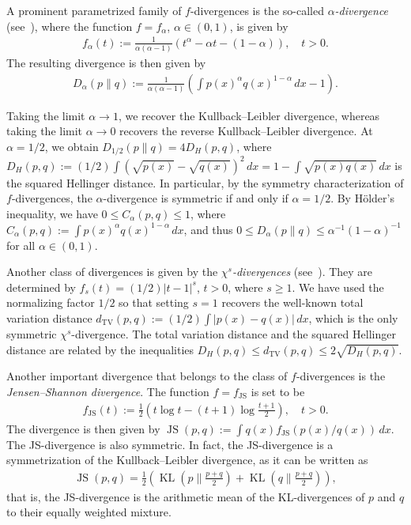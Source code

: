 A prominent parametrized family of $f$-divergences is the so-called \textit{$\alpha$-divergence} (see~\cite[Equation~(7)]{cichocki_families_2010}), where the function $f=f_{\alpha}$, $\alpha\in(0,1)$, is given by
\begin{align}\label{eq:alpha_generator}
    f_{\alpha}(t):=\frac{1}{\alpha(\alpha-1)}\left(t^{\alpha}-\alpha t-(1-\alpha)\right),\quad t>0.
\end{align}
The resulting divergence is then given by
\begin{align}\label{eq:alpha_divergence1}
    D_{\alpha}(p\|q):=\frac{1}{\alpha(\alpha-1)}\left(\int p(x)^{\alpha}q(x)^{1-\alpha}\,dx-1\right).
\end{align}

Taking the limit $\alpha\to1$, we recover the Kullback--Leibler divergence, whereas taking the limit $\alpha\to0$ recovers the reverse Kullback--Leibler divergence. At $\alpha=1/2$, we obtain $D_{1/2}(p\|q)=4D_H(p,q)$, where $D_H(p,q):=(1/2)\int(\sqrt{p(x)}-\sqrt{q(x)})^2\,dx=1-\int\sqrt{p(x)q(x)}\,dx$ is the squared Hellinger distance. In particular, by the symmetry characterization of $f$-divergences, the $\alpha$-divergence is symmetric if and only if $\alpha=1/2$. By Hölder's inequality, we have $0\le C_{\alpha}(p,q)\le 1$, where $C_{\alpha}(p,q):=\int p(x)^{\alpha}q(x)^{1-\alpha}\,dx$, and thus $0\le D_{\alpha}(p\| q)\le\alpha^{-1}(1-\alpha)^{-1}$ for all $\alpha\in(0,1)$.

Another class of divergences is given by the \textit{$\chi^s$-divergences} (see~\cite[Equation~(32)]{sason_f-divergences_2018}). They are determined by $f_s(t)=(1/2)|t-1|^s$, $t>0$, where $s\ge1$. We have used the normalizing factor $1/2$ so that setting $s=1$ recovers the well-known total variation distance $d_{\text{TV}}(p,q):=(1/2)\int|p(x)-q(x)|\,dx$, which is the only symmetric $\chi^s$-divergence. The total variation distance and the squared Hellinger distance are related by the inequalities $D_H(p,q)\le d_{\text{TV}}(p,q)\le2\sqrt{D_H(p,q)}$.

Another important divergence that belongs to the class of $f$-divergences is the \textit{Jensen--Shannon divergence}. The function $f=f_{\operatorname{JS}}$ is set to be
\begin{align}\label{eq:js_generator}
    f_{\operatorname{JS}}(t):=\frac{1}{2}\left(t\log{t}-(t+1)\log{\frac{t+1}{2}}\right),\quad t>0.
\end{align}
The divergence is then given by $\operatorname{JS}(p,q):=\int q(x)f_{\operatorname{JS}}(p(x)/q(x))\,dx$. The JS-divergence is also symmetric. In fact, the JS-divergence is a symmetrization of the Kullback--Leibler divergence, as it can be written as
\begin{align}\label{eq:JS_KL_formula}
    \operatorname{JS}(p,q)=\frac{1}{2}\left(\operatorname{KL}\left(p\big\|\frac{p+q}{2}\right)+\operatorname{KL}\left(q\big\|\frac{p+q}{2}\right)\right),
\end{align}
that is, the JS-divergence is the arithmetic mean of the KL-divergences of $p$ and $q$ to their equally weighted mixture.

